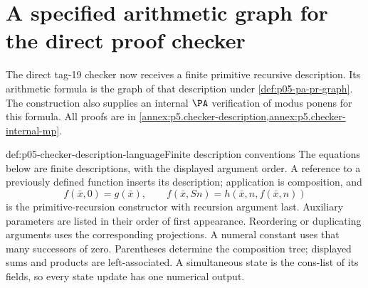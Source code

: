 \section{A specified arithmetic graph for the direct proof checker}
\label{sec:p05-pa-checker-arithmetization}

The direct tag-19 checker now receives a finite primitive recursive
description.  Its arithmetic formula is the graph of that description under
\cref{def:p05-pa-pr-graph}.  The construction also supplies an internal
\(\PA\) verification of modus ponens for this formula.  All proofs are in
\cref{annex:p5.checker-description,annex:p5.checker-internal-mp}.

\begin{hbdefinition}{def:p05-checker-description-language}{Finite description conventions}
The equations below are finite descriptions, with the displayed argument
order.  A reference to a previously defined function inserts its description;
application is composition, and
\[
 f(\bar x,0)=g(\bar x),\qquad
 f(\bar x,Sn)=h(\bar x,n,f(\bar x,n))
\]
is the primitive-recursion constructor with recursion argument last.  Auxiliary
parameters are listed in their order of first appearance.  Reordering or
duplicating arguments uses the corresponding projections.  A numeral constant
uses that many successors of zero.  Parentheses determine the composition
tree; displayed sums and products are left-associated.  A simultaneous state
is the cons-list of its fields, so every state update has one numerical output.


\end{hbdefinition}
